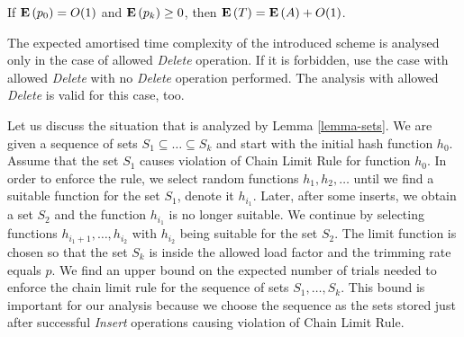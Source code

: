 \begin{remark}
\label{remark-expected-sequence}
If $\mathbf{E}\left(p_0\right) = O(1)$ and $\mathbf{E}\left(p_k\right) \geq 0$, then $\mathbf{E}\left(T\right) = \mathbf{E}\left(A\right) + O(1)$.
\end{remark}

The expected amortised time complexity of the introduced scheme is analysed only in the case of allowed \emph{Delete} operation. If it is forbidden, use the case with allowed \emph{Delete} with no \emph{Delete} operation performed. The analysis with allowed \emph{Delete} is valid for this case, too.

Let us discuss the situation that is analyzed by Lemma \ref{lemma-sets}. We are given a sequence of sets $S_1 \subseteq \dots \subseteq S_k$ and start with the initial hash function $h_0$. Assume that the set $S_1$ causes violation of Chain Limit Rule for function $h_0$. In order to enforce the rule, we select random functions $h_1, h_2, \dots$ until we find a suitable function for the set $S_1$, denote it $h_{i_1}$. Later, after some inserts, we obtain a set $S_2$ and the function $h_{i_1}$ is no longer suitable. We continue by selecting functions $h_{i_1 + 1}, \dots, h_{i_2}$ with $h_{i_2}$ being suitable for the set $S_2$. The limit function is chosen so that the set $S_k$ is inside the allowed load factor and the trimming rate equals $p$. We find an upper bound on the expected number of trials needed to enforce the chain limit rule for the sequence of sets $S_1, \dots, S_k$. This bound is important for our analysis because we choose the sequence as  the sets stored just after successful \emph{Insert} operations causing violation of Chain Limit Rule.

